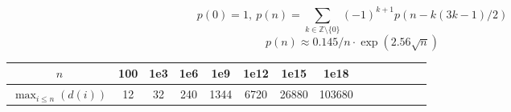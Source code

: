 \[ p(0) = 1,\ p(n) = \sum_{k \in \mathbb Z \setminus \{0\}}{(-1)^{k+1} p(n - k(3k-1) / 2)} \]
\[ p(n) \approx 0.145 / n \cdot \exp(2.56 \sqrt{n}) \]


\begin{center}
\begin{tabular}{c|c@{\ }c@{\ }c@{\ }c@{\ }c@{\ }c@{\ }c@{\ }c@{\ }c@{\ }c@{\ }c@{\ }c@{\ }c}
        $n$                      & 100 & 1e3 & 1e6 & 1e9  & 1e12 & 1e15  & 1e18 \\ \hline
        $\max _ {i\leq n}(d(i))$ & 12  & 32  & 240 & 1344 & 6720 & 26880 & 103680 \\
\end{tabular}
\end{center}



